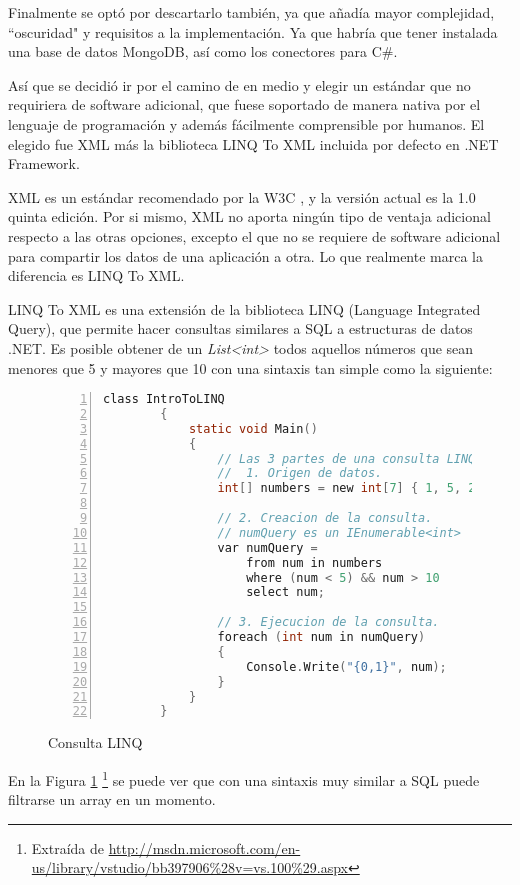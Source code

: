 Finalmente se opt\'o por descartarlo tambi\'en, ya que a\~nad\'ia mayor complejidad, ``oscuridad" y requisitos a la 
implementaci\'on. Ya que habr\'ia que tener instalada una base de datos MongoDB, as\'i como los conectores para
C\#.

As\'i que se decidi\'o ir por el camino de en medio y elegir un est\'andar que no requiriera de software adicional,
que fuese soportado de manera nativa por el lenguaje de programaci\'on y adem\'as f\'acilmente comprensible por
humanos. El elegido fue XML m\'as la biblioteca LINQ To XML incluida por defecto en .NET Framework. 

XML es un est\'andar recomendado por la W3C \cite{XML:Specification}, y la versi\'on actual es la 1.0 quinta edici\'on.
Por si mismo, XML no aporta ning\'un tipo de ventaja adicional respecto a las otras opciones, excepto el que no se
requiere de software adicional para compartir los datos de una aplicaci\'on a otra. Lo que realmente marca
la diferencia es LINQ To XML.

LINQ To XML es una extensi\'on de la biblioteca LINQ (Language Integrated Query), que permite hacer consultas
similares a SQL a estructuras de datos .NET. Es posible obtener de un \emph{List<int>} todos aquellos n\'umeros
que sean menores que 5 y mayores que 10 con una sintaxis tan simple como la siguiente:

\begin{figure}[H]
	\begin{lstlisting}[tabsize=2, language=C, numbers=left, showspaces=false, breaklines=true]
		class IntroToLINQ
		{        
			static void Main()
			{
				// Las 3 partes de una consulta LINQ:
				//  1. Origen de datos.
				int[] numbers = new int[7] { 1, 5, 20, -4, 7, 8, 9};
				
				// 2. Creacion de la consulta.
				// numQuery es un IEnumerable<int>
				var numQuery =
					from num in numbers
					where (num < 5) && num > 10
					select num;
				
				// 3. Ejecucion de la consulta.
				foreach (int num in numQuery)
				{
					Console.Write("{0,1}", num);
				}
			}
		}
	\end{lstlisting}
	\caption[Consulta LINQ]{Consulta LINQ}
	\label{Consulta LINQ}
\end{figure}

En la Figura \ref{Consulta LINQ}
\footnote{Extra\'ida de \url{http://msdn.microsoft.com/en-us/library/vstudio/bb397906\%28v=vs.100\%29.aspx}}
se puede ver que con una sintaxis muy similar a SQL puede filtrarse un array en un momento.

